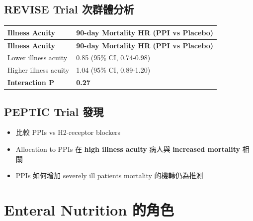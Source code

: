 \documentclass[12pt,a4paper]{article}
\begin{document}
\subsection{REVISE Trial 次群體分析}

\begin{longtable}{p{5cm}p{9cm}}
\toprule
\textbf{Illness Acuity} & \textbf{90-day Mortality HR (PPI vs Placebo)} \\
\midrule
\endfirsthead

\toprule
\textbf{Illness Acuity} & \textbf{90-day Mortality HR (PPI vs Placebo)} \\
\midrule
\endhead

\bottomrule
\endfoot

Lower illness acuity & 0.85 (95\% CI, 0.74-0.98) \\
\midrule
Higher illness acuity & 1.04 (95\% CI, 0.89-1.20) \\
\midrule
\textbf{Interaction P} & \textbf{0.27} \\
\bottomrule
\end{longtable}

\subsection{PEPTIC Trial 發現}

\begin{itemize}
    \item 比較 PPIs vs H2-receptor blockers
    \item Allocation to PPIs 在 \textbf{high illness acuity} 病人與 \textbf{increased mortality} 相關
    \item PPIs 如何增加 severely ill patients mortality 的機轉仍為推測
\end{itemize}


\section{Enteral Nutrition 的角色}
\end{document}
